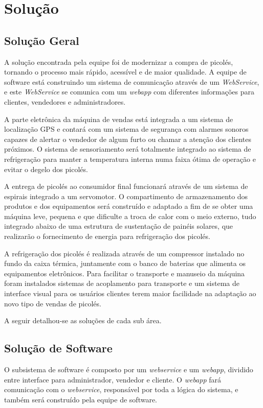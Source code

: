 \chapter{Solução}

\section{Solução Geral}

A solução encontrada pela equipe foi de modernizar a compra de picolés, tornando o processo mais rápido, acessível e de maior qualidade. A equipe de software está construindo um sistema de comunicação através de um \textit{WebService}, e este \textit{WebService} se comunica com um \textit{webapp} com diferentes informações para clientes, vendedores e administradores.

A parte eletrônica da máquina de vendas está integrada a um sistema de localização GPS e contará com um sistema de segurança com alarmes sonoros capazes de alertar o vendedor de algum furto ou chamar a atenção dos clientes próximos. O sistema de sensoriamento será totalmente integrado ao sistema de refrigeração para manter a temperatura interna numa faixa ótima de operação e evitar o degelo dos picolés.

A entrega de picolés ao consumidor final funcionará através de um sistema de espirais integrado a um servomotor. O compartimento de armazenamento dos produtos e dos equipamentos será construído e adaptado a fim de se obter uma máquina leve, pequena e que dificulte a troca de calor com o meio externo, tudo integrado abaixo de uma estrutura de sustentação de painéis solares, que realizarão o fornecimento de energia para refrigeração dos picolés.

A refrigeração dos picolés é realizada através de um compressor instalado no fundo da caixa térmica,  juntamente com o banco de baterias que alimenta os equipamentos eletrônicos. Para facilitar o transporte e manuseio da máquina foram instalados sistemas de acoplamento para transporte e um sistema de interface visual para os usuários clientes terem maior facilidade na adaptação ao novo tipo de vendas de picolés.

A seguir detalhou-se as soluções de cada sub área.

\section{Solução de Software}

O subsistema de software é composto por um \textit{webservice} e um \textit{webapp}, dividido entre interface para administrador, vendedor e cliente. O \textit{webapp} fará comunicação com o \textit{webservice}, responsável por toda a lógica do sistema, e também será construído pela equipe de software.


